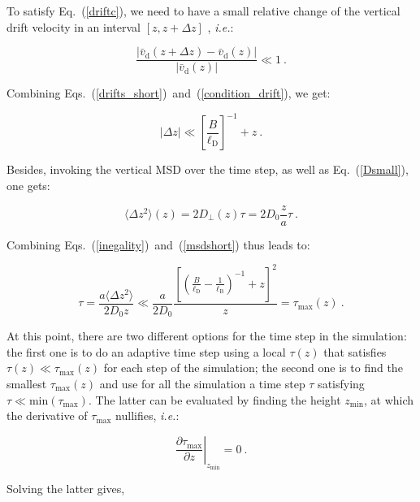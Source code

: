 To satisfy Eq.~(\ref{driftc}), we need to have a small relative change of the vertical drift velocity in an interval $[z, z+\Delta z]$ \cite{matse_state-dependent_nodate}, \textit{i.e.}:

\begin{equation}
	\frac{|\bar{v}_\mathrm{d} (z + \Delta z) - \bar{v}_\mathrm{d} (z)|}{|\bar{v}_\mathrm{d} (z)|} \ll 1 ~.
	\label{condition_drift}
\end{equation}

Combining Eqs.~(\ref{drifts_short})~and~(\ref{condition_drift}), we get:

\begin{equation}
	|\Delta z |\ll \left[\frac{B}{\ell_{\mathrm{D}}}\right]^{-1} + z ~.
	\label{inegality}
\end{equation}


Besides, invoking the vertical \gls{MSD} over the time step, as well as Eq.~(\ref{Dsmall}), one gets:

\begin{equation}
	\langle \Delta z ^2 \rangle (z) = 2 D_\bot (z) \tau = 2D_0 \frac{z}{a}\tau ~.
	\label{msdshort}
\end{equation}

Combining Eqs.~(\ref{inegality})~and~(\ref{msdshort}) thus leads to:

\begin{equation}
	\tau = \frac{a\langle \Delta z ^2 \rangle }{2 D_0 z} \ll \frac{a}{2 D_0 } \frac{\left[\left(\frac{B}{\ell_\mathrm{D}} - \frac{1}{\ell_{\mathrm{B}}}\right)^{-1} + z\right] ^2}{z} = \tau_\mathrm{max} (z)~.
	\label{taumax}
\end{equation}

 At this point, there are two different options for the time step in the simulation: the first one is to do an adaptive time step using a local $\tau(z)$ that satisfies $\tau(z) \ll \tau_{\textrm{max}}(z)$ for each step of the simulation; the second one is to find the smallest $\tau_\mathrm{max}(z)$ and use for all the simulation a time step $\tau$ satisfying $\tau \ll \mathrm{min}(\tau_\mathrm{max}) $. The latter can be evaluated by finding the height $z_\mathrm{min}$, at which the derivative of $ \tau_\mathrm{max}$ nullifies, \textit{i.e.}:

\begin{equation}
	\left. \frac{\partial \tau_\mathrm{max}}{\partial z} \right| _{z_\mathrm{min} }= 0 ~.
\end{equation} 

Solving the latter gives,

